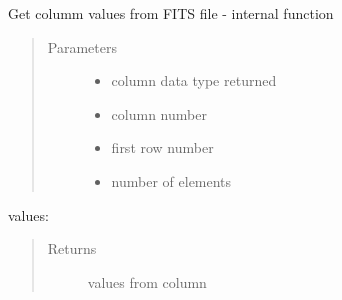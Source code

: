 \documentclass[letterpaper,10pt,english]{sphinxmanual}
\begin{document}

\begin{fulllineitems}
\label{\detokenize{qfits_functions:qfits.fitsgcolv}}
Get columm values from FITS file - internal function
\begin{quote}\begin{description}
\item[{Parameters}] \leavevmode\begin{itemize}
\item {} 
 \textendash{} column data type returned

\item {} 
 \textendash{} column number

\item {} 
 \textendash{} first row number

\item {} 
 \textendash{} number of elements

\end{itemize}

\end{description}\end{quote}
\begin{description}
\item[{ values:}] \leavevmode
{}

\end{description}
\begin{quote}\begin{description}
\item[{Returns}] \leavevmode
values from column

\end{description}\end{quote}

\end{fulllineitems}
\end{document}
